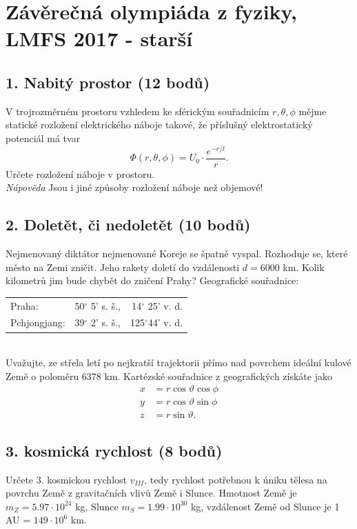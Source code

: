 \documentclass[12pt,a4paper]{article}
\author{Ondřej Zelenka}
\begin{document}

\section*{Závěrečná olympiáda z fyziky, LMFS 2017 - starší}

\subsection*{1. Nabitý prostor (12 bodů)}
V trojrozměrném prostoru vzhledem ke sférickým souřadnicím $r,\theta,\phi$ mějme statické rozložení elektrického náboje takové, že příslušný elektrostatický potenciál má tvar
\begin{equation}
\Phi\left(r,\theta,\phi\right) = U_0\cdot\frac{e^{-r/l}}{r}.
\end{equation}
Určete rozložení náboje v prostoru.\\
\emph{Nápověda} Jsou i jiné způsoby rozložení náboje než objemové!

\subsection*{2. Doletět, či nedoletět (10 bodů)}
Nejmenovaný diktátor nejmenované Koreje se špatně vyspal. Rozhoduje se, které město na Zemi zničit. Jeho rakety doletí do vzdálenosti $d = 6000$ km. Kolik kilometrů jim bude chybět do zničení Prahy? Geografické souřadnice:\\
\begin{tabular}{l r r}
Praha: & 50$^\circ$ 5' s. š., & 14$^\circ$ 25' v. d.\\
Pchjongjang: & 39$^\circ$ 2' s. š., & 125$^\circ$44' v. d.
\end{tabular}\\
Uvažujte, ze střela letí po nejkratší trajektorii přímo nad povrchem ideální kulové Země o poloměru 6378 km. Kartézské souřadnice z geografických získáte jako
\begin{subequations}
\begin{align}
x &= r\cos\vartheta\cos\phi\\
y &= r\cos\vartheta\sin\phi\\
z &= r\sin\vartheta.
\end{align}
\end{subequations}

\subsection*{3. kosmická rychlost (8 bodů)}
Určete 3. kosmickou rychlost $v_{III}$, tedy rychlost potřebnou k úniku tělesa na povrchu Země z gravitačních vlivů Země i Slunce. Hmotnost Země je $m_Z = 5.97\cdot 10^{24}$ kg, Slunce $m_S = 1.99\cdot 10^{30}$ kg, vzdálenost Země od Slunce je 1 AU = $149\cdot 10^6$ km.
\end{document}
